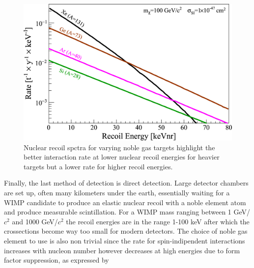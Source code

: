 \documentclass[11pt]{article} %
\begin{document}
\begin{figure}[H]
\centering
\includegraphics[scale=1]{images/recoil_spectra.jpg}
\caption{\cite{Schumann_2019} Nuclear recoil spctra for varying noble gas targets highlight the better interaction
rate at lower nuclear recoil energies for heavier targets but a lower rate for higher recoil energies.}
\label{fig:recoil_spectra}
\end{figure}
\par Finally, the last method of detection is direct detection.
Large detector chambers are set up, often many kilometers under the earth, essentially waiting for a WIMP
candidate to produce an elastic nuclear recoil with a noble element atom and produce measurable scintillation.
For a WIMP mass ranging between 1 GeV/$c^2$ and 1000 GeV/$c^2$ the recoil energies are in the range 1-100 keV
after which the crossections become way too small for modern detectors.
The choice of noble gas element to use is also non trivial since the rate for spin-indipendent interactions increases with
nucleon number however decreases at high energies due to form factor suppression, as expressed by
\end{document}
